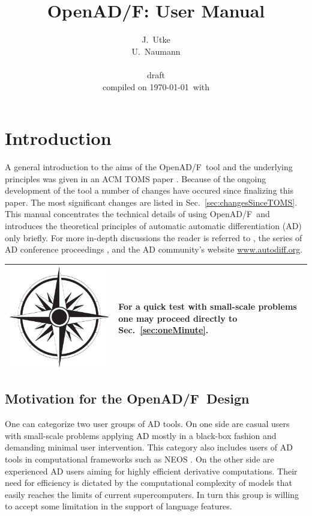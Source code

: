 \documentclass{book}
\title{OpenAD/F: User Manual}
\author{J.~Utke  \\
	U.~Naumann \\\\
\scriptsize draft  \\
\scriptsize compiled on \today\ with \\
\framebox{
\begin{minipage}{6.5cm}
\tiny

\end{minipage}
}
}
\date{ }
\newcommand{\OpenADF}{OpenAD/F}
\newcommand{\refsec}[1]{{Sec.~\ref{#1}}}
\newcommand{\nav}[1]{
\begin{tabular}{|m{.03\textwidth}|m{.9\textwidth}|}\hline
\vspace{1mm}
\includegraphics[width=.03\textwidth]{windrose_zh1}&
\vspace{1mm}
\begin{minipage}[c]{.86\textwidth}
\small {#1}
\end{minipage}
\vspace{1mm}
\\\hline
\end{tabular}
}
\begin{document}
\maketitle
\tableofcontents
\listoffigures
\listoftables

\pagestyle{fancy}
\lstset{basicstyle=\small\tt, 
	numbers=left, 
	numberstyle=\scriptsize,
  	stepnumber=1, 
	numbersep=10pt, 
	breaklines=true,
	resetmargins=false,
	xleftmargin=6ex,
	columns=fullflexible}
\chapter{Introduction} \label{sec:Introduction}

A general introduction to the aims of the \OpenADF\ tool and the underlying principles 
was given in an ACM TOMS paper \cite{Utke2008OAM}. 
Because of the ongoing development of the tool a number of changes have occured 
since finalizing this paper. The most significant changes are listed in \refsec{sec:changesSinceTOMS}.
This manual concentrates the technical details of using \OpenADF\ and introduces the 
theoretical principles of automatic automatic differentiation (AD) only 
briefly. For more in-depth discussions the reader is referred to 
\cite{Griewank2008EDP}, the series of AD conference proceedings 
\cite{Griewank1991ADo,Berz1996CDT,Corliss2002ADo,Bucker2005ADA,Bischof2008AiA},
and the AD community's website \url{www.autodiff.org}. \\
\nav{For a quick test with small-scale problems one may proceed directly to \refsec{sec:oneMinute}.} 

\section{Motivation for the \OpenADF\ Design}


One can categorize two user groups of AD tools. 
On one side are casual users 
with small-scale problems applying AD mostly in a black-box fashion 
and demanding minimal user intervention. 
This category also includes users of AD tools in  computational 
frameworks such as NEOS \cite{neosWeb}.
On the other side are experienced AD users aiming for highly efficient 
derivative computations.
Their need for efficiency is dictated by the 
computational complexity of models that easily reaches the limits of  current 
supercomputers. 
In turn this group is willing to accept some limitation in the support of 
language features.
\end{document}
